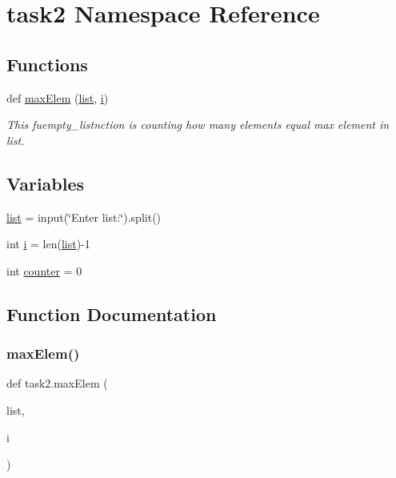 \hypertarget{namespacetask2}{}\section{task2 Namespace Reference}
\label{namespacetask2}
\subsection*{Functions}
\begin{DoxyCompactItemize}
\item 
def \hyperlink{namespacetask2_a4e33b9c71f2845eb0f474794063a6a6d}{max\+Elem} (\hyperlink{namespacetask2_a94c38e538a456d94f6e14ef3b773a659}{list}, \hyperlink{namespacetask2_ae7d6bf87558b9265d2bafe30522a356e}{i})
\begin{DoxyCompactList}\small\item\em This fuempty\+\_\+listnction is counting how many elements equal max element in list. \end{DoxyCompactList}\end{DoxyCompactItemize}
\subsection*{Variables}
\begin{DoxyCompactItemize}
\item 
\hyperlink{namespacetask2_a94c38e538a456d94f6e14ef3b773a659}{list} = input(\char`\"{}Enter list\+:\char`\"{}).split()
\item 
int \hyperlink{namespacetask2_ae7d6bf87558b9265d2bafe30522a356e}{i} = len(\hyperlink{namespacetask2_a94c38e538a456d94f6e14ef3b773a659}{list})-\/1
\item 
int \hyperlink{namespacetask2_ab0a969fcb76bbf76f7af5de61e8b0698}{counter} = 0
\end{DoxyCompactItemize}


\subsection{Function Documentation}
\mbox{\label{namespacetask2_a4e33b9c71f2845eb0f474794063a6a6d}} 
\subsubsection{\texorpdfstring{max\+Elem()}{maxElem()}}
{\footnotesize\ttfamily def task2.\+max\+Elem (\begin{DoxyParamCaption}\item[{}]{list,  }\item[{}]{i }\end{DoxyParamCaption})}



